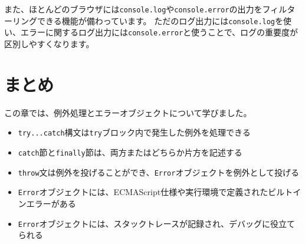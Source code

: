 また、ほとんどのブラウザには\texttt{console.log}や\texttt{console.error}の出力をフィルターリングできる機能が備わっています。
ただのログ出力には\texttt{console.log}を使い、エラーに関するログ出力には\texttt{console.error}と使うことで、ログの重要度が区別しやすくなります。

\hypertarget{conclusion}{%
\section{まとめ}\label{conclusion}}

この章では、例外処理とエラーオブジェクトについて学びました。

\begin{itemize}
\item
  \texttt{try...catch}構文は\texttt{try}ブロック内で発生した例外を処理できる
\item
  \texttt{catch}節と\texttt{finally}節は、両方またはどちらか片方を記述する
\item
  \texttt{throw}文は例外を投げることができ、\texttt{Error}オブジェクトを例外として投げる
\item
  \texttt{Error}オブジェクトには、ECMAScript仕様や実行環境で定義されたビルトインエラーがある
\item
  \texttt{Error}オブジェクトには、スタックトレースが記録され、デバッグに役立てられる
\end{itemize}
